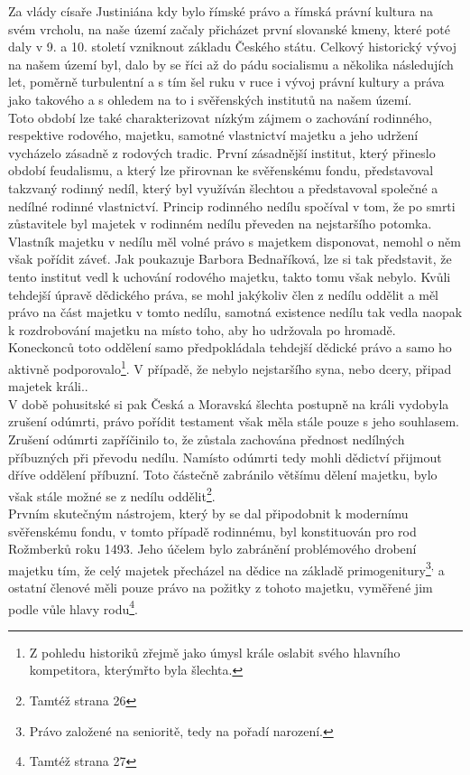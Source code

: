 \documentclass{article}
\begin{document}
Za vlády císaře Justiniána kdy bylo římské právo a římská právní kultura na svém vrcholu, na naše území začaly přicházet první slovanské kmeny, které poté daly v 9. a 10. století vzniknout základu Českého státu. Celkový historický vývoj na našem území byl, dalo by se říci až do pádu socialismu a několika následujích let, poměrně turbulentní a s tím šel ruku v ruce i vývoj právní kultury a práva jako takového a s ohledem na to i svěřenských institutů na našem území. \\

Toto období lze také charakterizovat nízkým zájmem o zachování rodinného, respektive rodového, majetku, samotné vlastnictví majetku a jeho udržení vycházelo zásadně z rodových tradic. První zásadnější institut, který přineslo období feudalismu, a který lze přirovnan ke svěřenskému fondu, představoval takzvaný rodinný nedíl, který byl využíván šlechtou a představoval společné a nedílné rodinné vlastnictví. Princip rodinného nedílu spočíval v tom, že po smrti zůstavitele byl majetek v rodinném nedílu převeden na nejstaršího potomka. Vlastník majetku v nedílu měl volné právo s majetkem disponovat, nemohl o něm však pořídit záveť. Jak poukazuje Barbora Bednaříková, lze si tak představit, že tento institut vedl k uchování rodového majetku, takto tomu však nebylo. Kvůli tehdejší úpravě dědického práva, se mohl jakýkoliv člen z nedílu oddělit a měl právo na část majetku v tomto nedílu, samotná existence nedílu tak vedla naopak k rozdrobování majetku na místo toho, aby ho udržovala po hromadě. Koneckonců toto oddělení samo předpokládala tehdejší dědické právo a samo ho aktivně podporovalo\footnote{Z pohledu historiků zřejmě jako úmysl krále oslabit svého hlavního kompetitora, kterýmřto byla šlechta.}. V případě, že nebylo nejstaršího syna, nebo dcery, připad majetek králi..\\

V době pohusitské si pak Česká a Moravská šlechta postupně na králi vydobyla zrušení odúmrti, právo pořídit testament však měla stále pouze s jeho souhlasem. Zrušení odúmrti zapříčinilo to, že zůstala zachována přednost nedílných příbuzných při převodu nedílu. Namísto odúmrti tedy mohli dědictví přijmout dříve oddělení příbuzní. Toto částečně zabránilo většímu dělení majetku, bylo však stále možné se z nedílu oddělit\footnote{Tamtéž strana 26}.\\

Prvním skutečným nástrojem, který by se dal připodobnit k modernímu svěřenskému fondu, v tomto případě rodinnému, byl konstituován pro rod Rožmberků roku 1493. Jeho účelem bylo zabránění problémového drobení majetku tím, že celý majetek přecházel na dědice na základě primogenitury\footnote{Právo založené na senioritě, tedy na pořadí narození.}\textsuperscript{,} a ostatní členové měli pouze právo na požitky z tohoto majetku, vyměřené jim podle vůle hlavy rodu\footnote{Tamtéž strana 27}.\\
\end{document}
